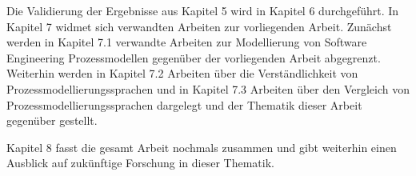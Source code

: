 Die Validierung der Ergebnisse aus Kapitel 5 wird in Kapitel 6 durchgeführt.
In Kapitel 7 widmet sich verwandten Arbeiten zur vorliegenden Arbeit. Zunächst werden in Kapitel 7.1 verwandte Arbeiten zur Modellierung von Software Engineering Prozessmodellen gegenüber der vorliegenden Arbeit abgegrenzt. Weiterhin werden in Kapitel 7.2 Arbeiten über die Verständlichkeit von Prozessmodellierungssprachen und in Kapitel 7.3 Arbeiten über den Vergleich von Prozessmodellierungssprachen dargelegt und der Thematik dieser Arbeit gegenüber gestellt.\newline

Kapitel 8 fasst die gesamt Arbeit nochmals zusammen und gibt weiterhin einen Ausblick auf zukünftige Forschung in dieser Thematik.


